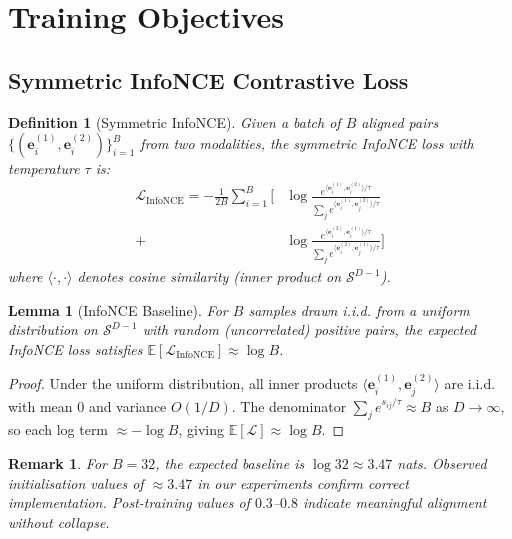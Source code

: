 \documentclass[10pt,conference]{IEEEtran}
\theoremstyle{ieeethm}
\newtheorem{lemma}[theorem]{Lemma}
\theoremstyle{ieeedef}
\newtheorem{definition}[theorem]{Definition}
\theoremstyle{ieeeremark}
\newtheorem*{remark}{Remark}
\begin{document}
\section{Training Objectives}
\label{sec:loss}

\subsection{Symmetric InfoNCE Contrastive Loss}

\begin{definition}[Symmetric InfoNCE]
\label{def:infonce}
Given a batch of $B$ aligned pairs $\{(\mathbf{e}^{(1)}_i, \mathbf{e}^{(2)}_i)\}_{i=1}^B$ from two modalities, the symmetric InfoNCE loss with temperature $\tau$ is:
\begin{equation}
\begin{split}
\mathcal{L}_{\text{InfoNCE}} = -\frac{1}{2B}\sum_{i=1}^{B}\Biggl[
  &\log\frac{e^{\langle\mathbf{e}^{(1)}_i,\mathbf{e}^{(2)}_i\rangle/\tau}}
           {\sum_{j} e^{\langle\mathbf{e}^{(1)}_i,\mathbf{e}^{(2)}_j\rangle/\tau}}\\
+ &\log\frac{e^{\langle\mathbf{e}^{(2)}_i,\mathbf{e}^{(1)}_i\rangle/\tau}}
           {\sum_{j} e^{\langle\mathbf{e}^{(2)}_i,\mathbf{e}^{(1)}_j\rangle/\tau}}
\Biggr]
\end{split}
\label{eq:infonce}
\end{equation}
where $\langle\cdot,\cdot\rangle$ denotes cosine similarity (inner product on $\mathcal{S}^{D-1}$).
\end{definition}

\begin{lemma}[InfoNCE Baseline]
\label{lem:infonce_baseline}
For $B$ samples drawn i.i.d. from a uniform distribution on $\mathcal{S}^{D-1}$ with random (uncorrelated) positive pairs, the expected InfoNCE loss satisfies $\mathbb{E}[\mathcal{L}_{\text{InfoNCE}}] \approx \log B$.
\end{lemma}
\begin{proof}
Under the uniform distribution, all inner products $\langle\mathbf{e}^{(1)}_i, \mathbf{e}^{(2)}_j\rangle$ are i.i.d. with mean $0$ and variance $O(1/D)$. The denominator $\sum_j e^{s_{ij}/\tau} \approx B$ as $D \to \infty$, so each log term $\approx -\log B$, giving $\mathbb{E}[\mathcal{L}] \approx \log B$.
\end{proof}

\begin{remark}
For $B=32$, the expected baseline is $\log 32 \approx 3.47$ nats. Observed initialisation values of $\approx 3.47$ in our experiments confirm correct implementation. Post-training values of $0.3$–$0.8$ indicate meaningful alignment without collapse.
\end{remark}
\end{document}
